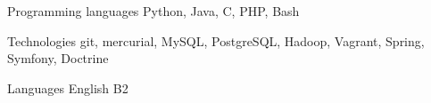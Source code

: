 
\begin{cvskills}

  \cvskill
    {Programming languages} %
    {Python, Java, C, PHP, Bash} %

  \cvskill
    {Technologies} %
    {git, mercurial, MySQL, PostgreSQL, Hadoop, Vagrant, Spring, Symfony, Doctrine} %

  \cvskill
    {Languages} %
    {English B2} %

\end{cvskills}
